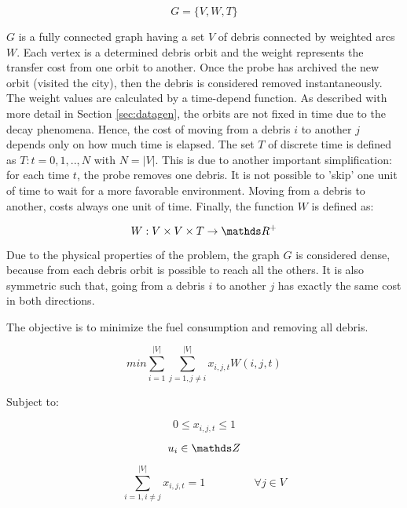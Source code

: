 \documentclass[a4paper,9pt,journal,twoside,compsoc]{PPIEEEtran}
\begin{document}
\begin{equation}
G = \{V, W, T\}
\end{equation}

$G$ is a fully connected graph having a set $V$ of debris connected by weighted arcs $W$. Each vertex is a determined debris orbit and the weight represents the transfer cost from one orbit to another. Once the probe has archived the new orbit (visited the city), then the debris is considered removed instantaneously. The weight values are calculated by a time-depend function. As described with more detail in Section \ref{sec:datagen}, the orbits are not fixed in time due to the decay phenomena. Hence, the cost of moving from a debris $i$ to another $j$ depends only on how much time is elapsed. The set $T$ of discrete time is defined as $T : t = 0,1,..,N$ with $N = |V|$. This is due to another important simplification: for each time $t$, the probe removes one debris. It is not possible to 'skip' one unit of time to wait for a more favorable environment. Moving from a debris to another, costs always one unit of time. Finally, the function $W$ is defined as:

\begin{equation}
W : V \times V \times T \rightarrow \R^+
\end{equation}

Due to the physical properties of the problem, the graph $G$ is considered dense, because from each debris orbit is possible to reach all the others. It is also symmetric such that, going from a debris $i$ to another $j$ has exactly the same cost in both directions.

The objective is to minimize the fuel consumption and removing all debris.

\begin{equation}
min \sum_{i=1}^{|V|}\sum_{j=1, j \neq i }^{|V|} x_{i,j,t} W(i, j, t)
\end{equation}

Subject to:

\begin{equation}
0 \leq x_{i,j,t} \leq 1
\end{equation}

\begin{equation}
u_i \in \Z
\end{equation}

\begin{equation}
\sum_{i=1, i \neq j}^{|V|} x_{i,j,t} = 1 \;\;\;\;\;\;\;\;\;\;\;\;\;\;\;\; \forall j \in V
\end{equation}
\end{document}
